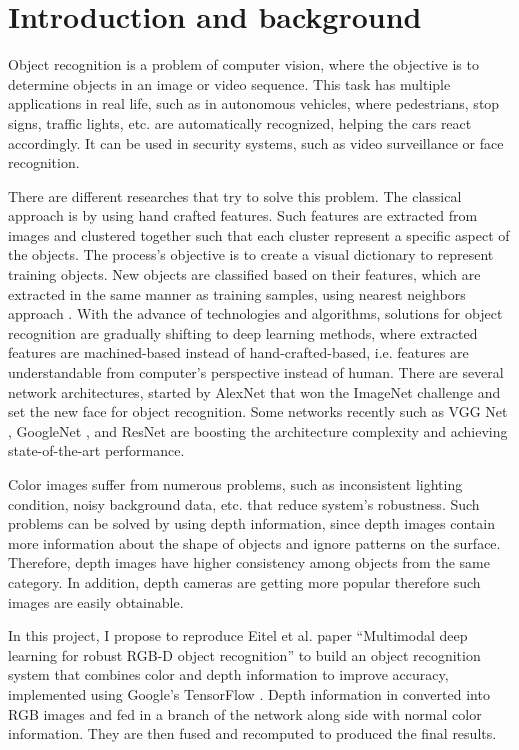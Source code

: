\section{Introduction and background}\label{sec:intro}
Object recognition is a problem of computer vision, where the objective is to determine objects in an image or video sequence. This task has multiple applications in real life, such as in autonomous vehicles, where pedestrians, stop signs, traffic lights, etc. are automatically recognized, helping the cars react accordingly. It can be used in security systems, such as video surveillance or face recognition.

There are different researches that try to solve this problem. The classical approach is by using hand crafted features. Such features are extracted from images and clustered together such that each cluster represent a specific aspect of the objects. The process's objective is to create a visual dictionary to represent training objects. New objects are classified based on their features, which are extracted in the same manner as training samples, using nearest neighbors approach \cite{lazebnik_bof}. With the advance of technologies and algorithms, solutions for object recognition are gradually shifting to deep learning methods, where extracted features are machined-based instead of hand-crafted-based, i.e. features are understandable from computer's perspective instead of human. There are several network architectures, started by AlexNet that won the ImageNet challenge and set the new face for object recognition. Some networks recently such as VGG Net \cite{Simonyan2014_vgg}, GoogleNet \cite{googlenet}, and ResNet \cite{resnet} are boosting the architecture complexity and achieving state-of-the-art performance.

Color images suffer from numerous problems, such as inconsistent lighting condition, noisy background data, etc. that reduce system's robustness. Such problems can be solved by using depth information, since depth images contain more information about the shape of objects and ignore patterns on the surface. Therefore, depth images have higher consistency among objects from the same category. In addition, depth cameras are getting more popular therefore such images are easily obtainable.

In this project, I propose to reproduce Eitel et al. paper ``Multimodal deep learning for robust RGB-D object recognition'' \cite{Eitel2015} to build an object recognition system that combines color and depth information to improve accuracy, implemented using Google's TensorFlow \cite{tensorflow2015-whitepaper}. Depth information in converted into RGB images and fed in a branch of the network along side with normal color information. They are then fused and recomputed to produced the final results.